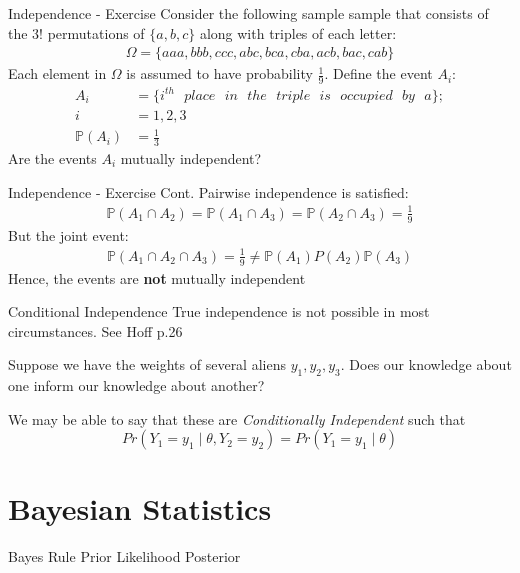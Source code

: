 \documentclass{beamer}
\begin{document}
\begin{frame}{Independence - Exercise}
Consider the following sample sample that consists of the 3! permutations of $\{a, b, c\}$  along with triples of each letter:
\begin{align*}
\Omega = \{aaa, bbb, ccc, abc, bca, cba, acb, bac, cab\}
\end{align*}
Each element in $\Omega$ is assumed to have probability $\frac{1}{9}$. Define the event $A_{i}$:
\begin{align*}
A_{i} &= \{i^{th}\>\>\> place \>\>\> in \>\>\> the \>\>\> triple \>\>\> is \>\>\> occupied \>\>\> by \>\>\> a \};\\ i &= 1,2,3 \\
\mathbb{P}(A_{i}) &= \frac{1}{3}
\end{align*}
Are the events $A_{i}$ mutually independent?
\end{frame}

\begin{frame}{Independence - Exercise Cont.}
Pairwise independence is satisfied:
\begin{align*}
\mathbb{P}(A_{1} \cap A_{2}) = \mathbb{P}(A_{1} \cap A_{3}) = \mathbb{P}(A_{2} \cap A_{3}) = \frac{1}{9}
\end{align*}
But the joint event:
\begin{align*}
\mathbb{P}(A_{1}\cap A_{2} \cap A_{3})  = \frac{1}{9} \neq \mathbb{P}(A_{1})P(A_{2})\mathbb{P}(A_{3})
\end{align*}
Hence, the events are \textbf{not} mutually independent
\end{frame}

\begin{frame}{Conditional Independence}
True independence is not possible in most circumstances. See Hoff p.26
\newline

Suppose we have the weights of several aliens $y_1, y_2, y_3$. Does our knowledge about one inform our knowledge about another?

We may be able to say that these are \emph{Conditionally Independent} such that 
$$Pr(Y_1 = y_1 \mid \theta, Y_2 = y_2) = Pr(Y_1 = y_1 \mid \theta)$$

\end{frame}

\section{Bayesian Statistics}
\begin{frame}{Bayes Rule}
Prior
Likelihood
Posterior

\end{frame}
\end{document}
